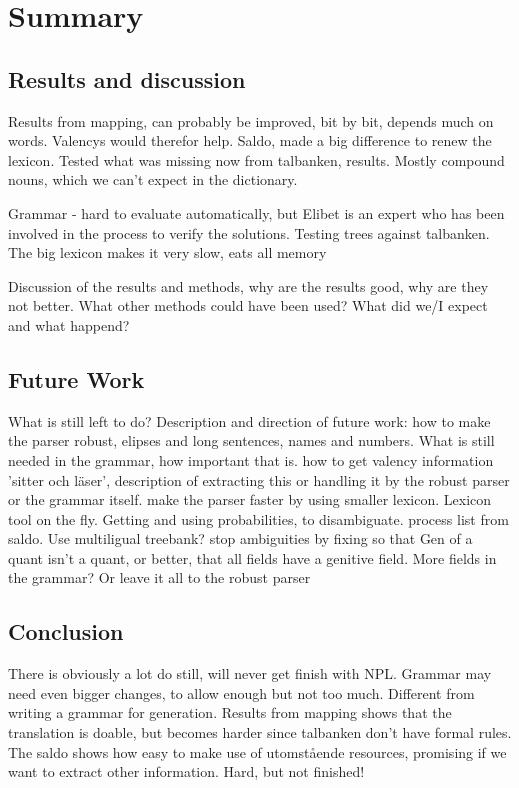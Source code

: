 \documentclass{report}
\begin{document}





\chapter{Summary}
\section{Results and discussion}
Results from mapping, can probably be improved, bit by bit, depends much on words.
Valencys would therefor help.  
Saldo, made a big difference to renew the lexicon. Tested what was missing now from talbanken,
results. Mostly compound nouns, which we can't expect in the dictionary.

Grammar - hard to evaluate automatically, but Elibet is an expert who has been involved
in the process to verify the solutions. Testing trees against talbanken.
The big lexicon makes it very slow, eats all memory

Discussion of the results and methods, why are the results good, why are they not better.
What other methods could have been used? What did we/I expect and what happend?


\section{Future Work}
What is still left to do? Description and direction of future work:
how to make the parser robust, elipses and long sentences, names and numbers.
What is still needed in the grammar, how important that is. 
how to get valency information 'sitter och läser', description of extracting this
or handling it by the robust parser or the grammar itself.
make the parser faster by using smaller lexicon.
Lexicon tool on the fly.
Getting and using probabilities, to disambiguate.
process list from saldo.
Use multiligual treebank?
stop ambiguities by fixing so that Gen of a quant isn't a quant, or better, that all fields
have a genitive field.
More fields in the grammar? Or leave it all to the robust parser


\section{Conclusion}
There is obviously a lot do still, will never get finish with NPL.
Grammar may need even bigger changes, to allow enough but not too much.
Different from writing a grammar for generation.
Results from mapping shows that the translation is doable, but becomes harder
since talbanken don't have formal rules.
The saldo shows how easy to make use of utomstående resources, promising if
we want to extract other information. 
Hard, but not finished! 
\end{document}
